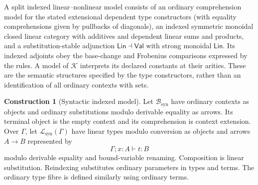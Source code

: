 \documentclass[11pt,a4paper]{article}
\numberwithin{equation}{section}
\theoremstyle{definition}
\newtheorem{construction}[construction]{Construction}
\theoremstyle{remark}
\theoremstyle{plain}
\providecommand{\Lin}{\mathsf{Lin}}
\providecommand{\Val}{\mathsf{Val}}
\providecommand{\linturn}{\vdash}
\providecommand{\cL}{\mathcal{L}}
\begin{document}
A split indexed linear--nonlinear model consists of an ordinary
comprehension model for the stated extensional dependent type constructors
(with equality comprehensions given by pullbacks of diagonals),
an indexed symmetric monoidal closed linear category with additives and
dependent linear sums and products, and a substitution-stable adjunction
$\Lin\dashv\Val$ with strong monoidal $\Lin$. Its indexed adjoints obey
the base-change and Frobenius comparisons expressed by the rules. A model
of $\mathcal K$ interprets its declared constants at their arities. These
are the semantic structures specified by the type constructors, rather
than an identification of all ordinary contexts with sets.

\begin{construction}[Syntactic indexed model]
\label{agt-con-syntactic}
Let $\mathcal B_{\mathrm{syn}}$ have ordinary contexts as objects and
ordinary substitutions modulo derivable equality as arrows. Its terminal
object is the empty context and its comprehension is context extension.
Over $\Gamma$, let $\cL_{\mathrm{syn}}(\Gamma)$ have linear types modulo
conversion as objects and arrows $A\to B$ represented by
\[
 \Gamma;x:A\linturn t:B
\]
modulo derivable equality and bound-variable renaming. Composition is linear
substitution. Reindexing substitutes ordinary parameters in types and terms.
The ordinary type fibre is defined similarly using ordinary terms.
\end{construction}
\end{document}
